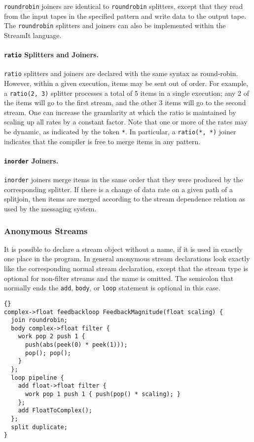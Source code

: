 \documentclass[11pt]{article}
\newcommand{\new}{\marginpar{\footnotesize \textbf{~~--~New~--}}}
\begin{document}
\lstinline|roundrobin| joiners are identical to \lstinline|roundrobin|
splitters, except that they read from the input tapes in the specified
pattern and write data to the output tape.  The \lstinline|roundrobin|
splitters and joiners can also be implemented within the StreamIt
language.

\paragraph{\lstinline|ratio| Splitters and Joiners.}  \lstinline|ratio| 
{\new} splitters and joiners are declared with the same syntax as
round-robin.  However, within a given execution, items may be sent out
of order.  For example, a \lstinline|ratio(2, 3)| splitter processes a
total of 5 items in a single execution; any 2 of the items will go to
the first stream, and the other 3 items will go to the second stream.
One can increase the granularity at which the ratio is maintained by
scaling up all rates by a constant factor.  Note that one or more of
the rates may be dynamic, as indicated by the token \lstinline|*|.  In
particular, a \lstinline|ratio(*, *)| joiner indicates that the
compiler is free to merge items in any pattern.

\paragraph{\lstinline|inorder| Joiners.}  \lstinline|inorder| {\new} 
joiners merge items in the same order that they were produced by the
corresponding splitter.  If there is a change of data rate on a given
path of a splitjoin, then items are merged according to the stream
dependence relation as used by the messaging system.

\subsubsection{Anonymous Streams}
\label{sec:anonymous-streams}

It is possible to declare a stream object without a name, if it is
used in exactly one place in the program.  In general anonymous stream
declarations look exactly like the corresponding normal stream
declaration, except that the stream type is optional for non-filter
streams and the name is omitted.  The semicolon that normally ends the
\lstinline|add|, \lstinline|body|, or \lstinline|loop| statement is
optional in this case.

\begin{lstlisting}{}
complex->float feedbackloop FeedbackMagnitude(float scaling) {
  join roundrobin;
  body complex->float filter {
    work pop 2 push 1 {
      push(abs(peek(0) * peek(1)));
      pop(); pop();
    }
  };
  loop pipeline {
    add float->float filter {
      work pop 1 push 1 { push(pop() * scaling); }
    };
    add FloatToComplex();
  };
  split duplicate;
}
\end{lstlisting}
\end{document}
